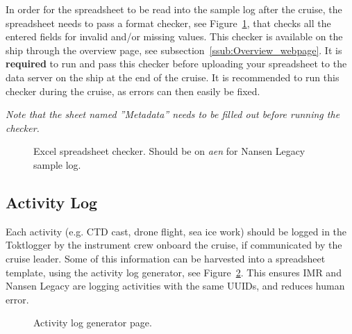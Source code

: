\documentclass[a4paper,english, 11pt]{article}
\begin{document}
In order for the spreadsheet to be read into the sample log after the cruise, the spreadsheet needs to pass a format checker, see Figure~\ref{fig:checker}, that checks all the entered fields for invalid and/or missing values. This checker is available on the ship through the overview page, see subsection~\ref{ssub:Overview_webpage}. It is \textbf{required} to run and pass this checker before uploading your spreadsheet to the data server on the ship at the end of the cruise. It is recommended to run this checker during the cruise, as errors can then easily be fixed.

\emph{Note that the sheet named ''Metadata'' needs to be filled out before running the checker.}

\begin{figure}[htb]
    \caption{\label{fig:checker}
        Excel spreadsheet checker. Should be on \emph{aen} for Nansen Legacy sample log.
    }
\end{figure}


\subsection{Activity Log} %
\label{sub:ActivityLog}

Each activity (e.g. CTD cast, drone flight, sea ice work) should be logged in the Toktlogger by the instrument crew onboard the cruise, if communicated by the cruise leader. Some of this information can be harvested into a spreadsheet template, using the activity log generator, see Figure~\ref{fig:activitylog}. This ensures IMR and Nansen Legacy are logging activities with the same UUIDs, and reduces human error.

\begin{figure}[htb]
    \caption{\label{fig:activitylog}
        Activity log generator page.
    }
\end{figure}
\end{document}
